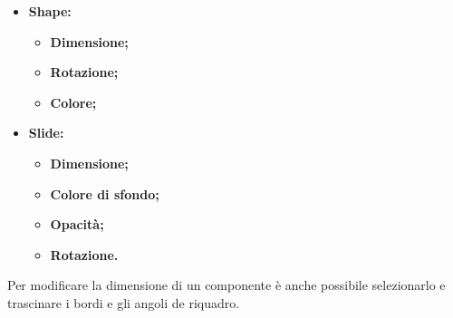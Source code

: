 \begin{itemize}
	\item \textbf{Shape:}
		\begin{itemize}
			\item \textbf{Dimensione;}
			\item \textbf{Rotazione;}
			\item \textbf{Colore;}
		\end{itemize}
	
	\item \textbf{Slide:}
		\begin{itemize}
			\item \textbf{Dimensione;}
			\item \textbf{Colore di sfondo;}
			\item \textbf{Opacità;}
			\item \textbf{Rotazione.}
		\end{itemize}	
	
\end{itemize}

\noindent Per modificare la dimensione di un componente è anche possibile selezionarlo e trascinare i bordi e gli angoli de riquadro.